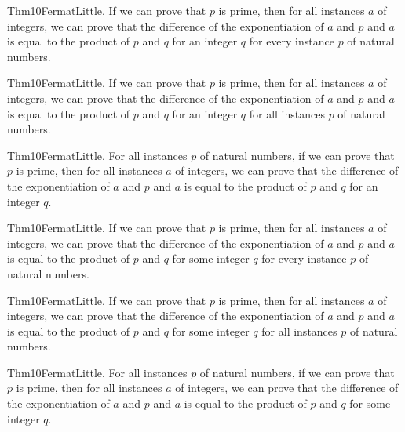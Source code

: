 \documentclass{article}
\begin{document}
Thm10FermatLittle. If we can prove that $p$ is prime, then for all instances $a$ of integers, we can prove that the difference of the exponentiation of $a$ and $p$ and $a$ is equal to the product of $p$ and $q$ for an integer $q$ for every instance $p$ of natural numbers.

Thm10FermatLittle. If we can prove that $p$ is prime, then for all instances $a$ of integers, we can prove that the difference of the exponentiation of $a$ and $p$ and $a$ is equal to the product of $p$ and $q$ for an integer $q$ for all instances $p$ of natural numbers.

Thm10FermatLittle. For all instances $p$ of natural numbers, if we can prove that $p$ is prime, then for all instances $a$ of integers, we can prove that the difference of the exponentiation of $a$ and $p$ and $a$ is equal to the product of $p$ and $q$ for an integer $q$.

Thm10FermatLittle. If we can prove that $p$ is prime, then for all instances $a$ of integers, we can prove that the difference of the exponentiation of $a$ and $p$ and $a$ is equal to the product of $p$ and $q$ for some integer $q$ for every instance $p$ of natural numbers.

Thm10FermatLittle. If we can prove that $p$ is prime, then for all instances $a$ of integers, we can prove that the difference of the exponentiation of $a$ and $p$ and $a$ is equal to the product of $p$ and $q$ for some integer $q$ for all instances $p$ of natural numbers.

Thm10FermatLittle. For all instances $p$ of natural numbers, if we can prove that $p$ is prime, then for all instances $a$ of integers, we can prove that the difference of the exponentiation of $a$ and $p$ and $a$ is equal to the product of $p$ and $q$ for some integer $q$.
\end{document}
